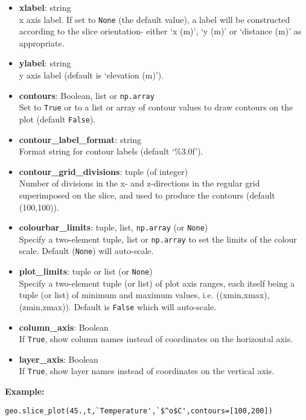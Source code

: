 \begin{itemize}
\item \textbf{xlabel}: string\\
  x axis label.  If set to \texttt{None} (the default value), a label will be constructed according to the slice orientation- either `x (m)', `y (m)' or `distance (m)' as appropriate.
\item \textbf{ylabel}: string\\
  y axis label (default is `elevation (m)').
\item \textbf{contours}: Boolean, list or \texttt{np.array}\\
  Set to \texttt{True} or to a list or array of contour values to draw contours on the plot (default \texttt{False}).
\item \textbf{contour\_label\_format}: string\\
  Format string for contour labels (default `\%3.0f').
\item \textbf{contour\_grid\_divisions}: tuple (of integer)\\
  Number of divisions in the x- and z-directions in the regular grid superimposed on the slice, and used to produce the contours (default (100,100)).
\item \textbf{colourbar\_limits}: tuple, list, \texttt{np.array} (or \texttt{None})\\
  Specify a two-element tuple, list or \texttt{np.array} to set the limits of the colour scale.  Default (\texttt{None}) will auto-scale.
\item \textbf{plot\_limits}: tuple or list (or \texttt{None})\\
  Specify a two-element tuple (or list) of plot axis ranges, each itself being a tuple (or list) of minimum and maximum values, i.e. ((xmin,xmax),(zmin,zmax)).  Default is \texttt{False} which will auto-scale.
\item \textbf{column\_axis}: Boolean\\
  If \texttt{True}, show column names instead of coordinates on the horizontal axis.
\item \textbf{layer\_axis}: Boolean\\
  If \texttt{True}, show layer names instead of coordinates on the vertical axis.
\end{itemize}

\textbf{Example:}

\begin{verbatim}
geo.slice_plot(45.,t,`Temperature',`$^o$C',contours=[100,200])
\end{verbatim}

